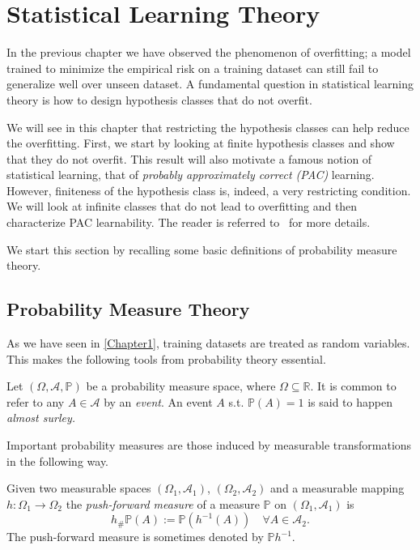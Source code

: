 \chapter{Statistical Learning Theory} %

\label{Chapter2} %
\setcounter{chapter}{2}
In the previous chapter we have observed the phenomenon of overfitting; a model
trained to minimize the empirical risk on a training dataset can still fail to generalize
well over unseen dataset. A fundamental question in statistical learning theory is how to design
hypothesis classes that do not overfit.  

We will see in this chapter that restricting the hypothesis classes can help
reduce the overfitting. First, we start by looking at finite hypothesis classes
and show that they do not overfit. This result will also motivate a famous
notion of statistical learning, that of \emph{probably approximately correct
(PAC)} learning. However, finiteness of the hypothesis class is, indeed, a very
restricting condition. We will look at infinite classes that do not lead to
overfitting and then characterize PAC learnability. The reader is referred to~\cite{Shalev:ML:2014} for more details. 

We start this section by recalling some basic definitions of probability
measure theory.
\section{Probability Measure Theory}
As we have seen in \autoref{Chapter1}, training datasets are treated as random
variables. This makes the following tools from probability theory essential. 

Let $(\Omega,\mathcal{A}, \mathbb{P})$ be a probability measure space, where $\Omega \subseteq \mathbb{R}$. 
It is common to refer to any $A \in \mathcal{A}$ by an \emph{event}. An event
$A$ s.t. $\mathbb{P}(A)=1$ is said to happen \emph{almost surley.}

Important probability measures are those induced by measurable transformations in the following way. 
\begin{definition}
	Given two measurable spaces $(\Omega_1, \mathcal{A}_1)$, $(\Omega_2, \mathcal{A}_2)$ and a measurable mapping $h:\Omega_1 \to \Omega_2$ 
	the \emph{push-forward measure} of a measure $\mathbb{P}$ on $(\Omega_1, \mathcal{A}_1)$ is 
	$$
	h_\#\mathbb{P} (A) := \mathbb{P} (h^{-1}(A)) \quad  \forall A \in \mathcal{A}_2.
	$$
	The push-forward measure is sometimes denoted by $\mathbb{P} h^{-1}$.
\end{definition}

